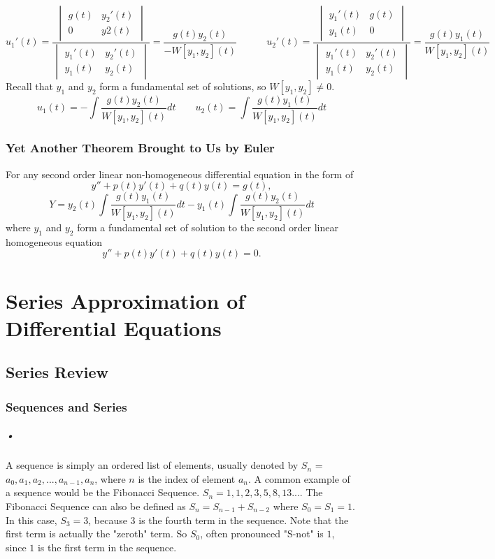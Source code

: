 \documentclass[font =22]{report}
\begin{document}
 \[
 u_1'(t) = \frac{
\begin{vmatrix}
g(t)&y_2'(t)\\
0&y2(t)
\end{vmatrix}
}{
\begin{vmatrix}
y_1'(t)&y_2'(t)\\
y_1(t)&y_2(t)
\end{vmatrix}
}
= \frac{g(t)y_2(t)}{-W[y_1,y_2](t)}
\quad \quad \quad
u_2'(t) = \frac{
\begin{vmatrix}
y_1'(t)&g(t)\\
y_1(t)&0
\end{vmatrix}
}{
\begin{vmatrix}
y_1'(t)&y_2'(t)\\
y_1(t)&y_2(t)
\end{vmatrix}
}
= \frac{g(t)y_1(t)}{W[y_1,y_2](t)}
 \]
 Recall that $y_1$ and $y_2$ form a fundamental set of solutions, so $W[y_1,y_2] \neq 0$.
\[
u_1(t) = - \int{\frac{g(t)y_2(t)}{W[y_1,y_2](t)}dt}
\quad \quad
u_2(t) = \int{\frac{g(t)y_1(t)}{W[y_1,y_2](t)}dt}
\]
\subsection{Yet Another Theorem Brought to Us by Euler}
For any second order linear non-homogeneous differential equation in the form of 
\[
y''+p(t)y'(t)+q(t)y(t) = g(t),
\]
\[
Y = y_2(t)\int{\frac{g(t)y_1(t)}{W[y_1,y_2](t)}dt}- y_1(t)\int{\frac{g(t)y_2(t)}{W[y_1,y_2](t)}dt}
\]
where $y_1$ and $y_2$ form a fundamental set of solution to the second order linear homogeneous equation 
\[
y''+p(t)y'(t)+q(t)y(t) = 0.
\]


\chapter{Series Approximation of Differential Equations }
\section{Series Review}
\subsection*{Sequences and Series}
\paragraph{•}
A sequence is simply an ordered list of elements, usually denoted by $S_n$ = ${a_0,a_1,a_2,...,a_{n-1},a_n}$, where $n$ is the index of element $a_n$. A common example of a sequence would be the Fibonacci Sequence. $S_n = 1,1,2,3,5,8,13...$. The Fibonacci Sequence can also be defined as $S_{n} = S_{n-1}+ S_{n-2}$ where $S_0 = S_1 = 1$. In this case, $S_3 = 3$, because 3 is the fourth term in the sequence. 
Note that the first term is actually the "zeroth" term. So $S_0$, often pronounced "S-not" is $1$, since $1$ is the first term in the sequence.
\end{document}
